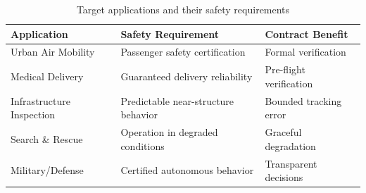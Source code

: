 \begin{table}[htbp]
    \centering
    \caption{Target applications and their safety requirements}
    \label{tab:applications}
    \begin{tabular}{@{}lll@{}}
        \toprule
        \textbf{Application} & \textbf{Safety Requirement} & \textbf{Contract Benefit} \\
        \midrule
        Urban Air Mobility & Passenger safety certification & Formal verification \\
        Medical Delivery & Guaranteed delivery reliability & Pre-flight verification \\
        Infrastructure Inspection & Predictable near-structure behavior & Bounded tracking error \\
        Search \& Rescue & Operation in degraded conditions & Graceful degradation \\
        Military/Defense & Certified autonomous behavior & Transparent decisions \\
        \bottomrule
    \end{tabular}
\end{table}
